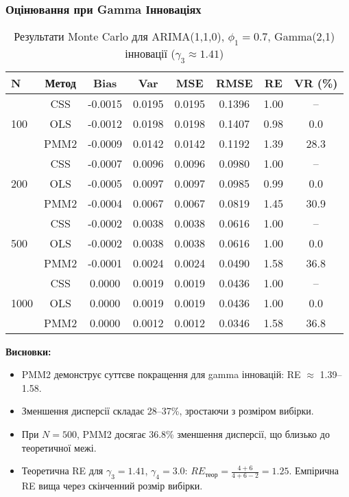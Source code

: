 \documentclass[12pt,a4paper]{article}
\begin{document}
	\subsubsection{Оцінювання при Gamma Інноваціях}
	
	\begin{table}[h]
		\centering
		\caption{Результати Monte Carlo для ARIMA(1,1,0), $\phi_1 = 0.7$, Gamma(2,1) інновації ($\gamma_3 \approx 1.41$)}
		\label{tab:arima110_gamma}
		\begin{tabular}{@{}lccccccc@{}}
			\toprule
			\textbf{N} & \textbf{Метод} & \textbf{Bias} & \textbf{Var} & \textbf{MSE} & \textbf{RMSE} & \textbf{RE} & \textbf{VR (\%)} \\
			\midrule
			\multirow{3}{*}{100} & CSS  & -0.0015 & 0.0195 & 0.0195 & 0.1396 & 1.00 & -- \\
			& OLS  & -0.0012 & 0.0198 & 0.0198 & 0.1407 & 0.98 & 0.0 \\
			& PMM2 & -0.0009 & 0.0142 & 0.0142 & 0.1192 & 1.39 & 28.3 \\
			\midrule
			\multirow{3}{*}{200} & CSS  & -0.0007 & 0.0096 & 0.0096 & 0.0980 & 1.00 & -- \\
			& OLS  & -0.0005 & 0.0097 & 0.0097 & 0.0985 & 0.99 & 0.0 \\
			& PMM2 & -0.0004 & 0.0067 & 0.0067 & 0.0819 & 1.45 & 30.9 \\
			\midrule
			\multirow{3}{*}{500} & CSS  & -0.0002 & 0.0038 & 0.0038 & 0.0616 & 1.00 & -- \\
			& OLS  & -0.0002 & 0.0038 & 0.0038 & 0.0616 & 1.00 & 0.0 \\
			& PMM2 & -0.0001 & 0.0024 & 0.0024 & 0.0490 & 1.58 & 36.8 \\
			\midrule
			\multirow{3}{*}{1000} & CSS  & 0.0000 & 0.0019 & 0.0019 & 0.0436 & 1.00 & -- \\
			& OLS  & 0.0000 & 0.0019 & 0.0019 & 0.0436 & 1.00 & 0.0 \\
			& PMM2 & 0.0000 & 0.0012 & 0.0012 & 0.0346 & 1.58 & 36.8 \\
			\bottomrule
		\end{tabular}
	\end{table}
	
	\textbf{Висновки:}
	\begin{itemize}
		\item PMM2 демонструє суттєве покращення для gamma інновацій: RE $\approx$ 1.39--1.58.
		\item Зменшення дисперсії складає 28--37\%, зростаючи з розміром вибірки.
		\item При $N = 500$, PMM2 досягає 36.8\% зменшення дисперсії, що близько до теоретичної межі.
		\item Теоретична RE для $\gamma_3 = 1.41$, $\gamma_4 = 3.0$: $RE_{\text{теор}} = \frac{4+6}{4+6-2} = 1.25$. Емпірична RE вища через скінченний розмір вибірки.
	\end{itemize}
	
\end{document}
